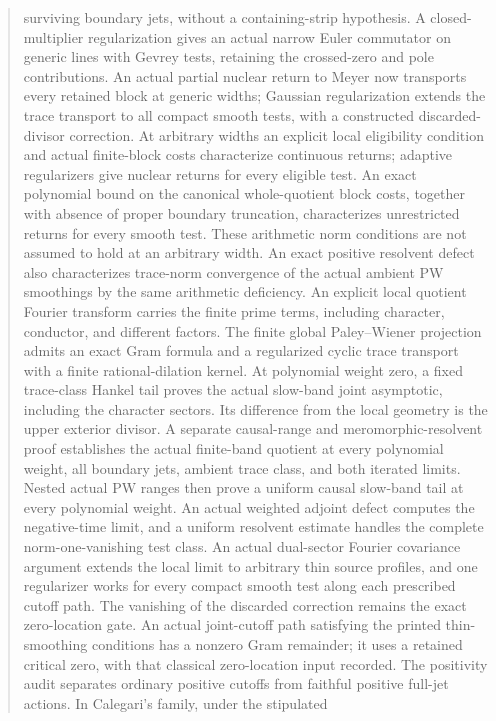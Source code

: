 \documentclass[11pt,a4paper]{article}
\begin{document}
\begin{abstract}
surviving boundary jets, without a containing-strip hypothesis.
A closed-multiplier regularization gives an actual narrow
Euler commutator on generic lines with Gevrey tests, retaining
the crossed-zero and pole contributions. An actual partial nuclear
return to Meyer now transports every retained block at generic
widths; Gaussian regularization extends the trace transport to
all compact smooth tests, with a constructed discarded-divisor
correction. At arbitrary widths an explicit local eligibility condition
and actual finite-block costs characterize continuous returns; adaptive
regularizers give nuclear returns for every eligible test. An exact
polynomial bound on the canonical whole-quotient block costs,
together with absence of proper boundary truncation, characterizes
unrestricted returns for every smooth test. These arithmetic norm
conditions are not assumed to hold at an arbitrary width. An exact
positive resolvent defect also characterizes trace-norm convergence
of the actual ambient PW smoothings by the same arithmetic deficiency. An explicit local quotient Fourier transform carries
the finite prime terms, including character, conductor, and
different factors. The finite global Paley--Wiener projection
admits an exact Gram formula and a regularized cyclic trace
transport with a finite rational-dilation kernel. At polynomial
weight zero, a fixed trace-class Hankel tail proves the actual
slow-band joint asymptotic, including the character sectors. Its
difference from the local geometry is the upper exterior divisor.
A separate causal-range and meromorphic-resolvent proof establishes
the actual finite-band quotient at every polynomial weight, all
boundary jets, ambient trace class, and both iterated limits.
Nested actual PW ranges then prove a uniform causal slow-band
tail at every polynomial weight. An actual weighted adjoint defect
computes the negative-time limit, and a uniform resolvent estimate
handles the complete norm-one-vanishing test class. An actual dual-sector Fourier covariance argument extends the local
limit to arbitrary thin source profiles, and one regularizer works
for every compact smooth test along each prescribed cutoff path.
The vanishing of the discarded correction remains the exact zero-location gate. An actual joint-cutoff path
satisfying the printed thin-smoothing conditions has a nonzero
Gram remainder; it uses a retained critical zero, with that
classical zero-location input recorded. The positivity
audit separates ordinary positive cutoffs from faithful positive
full-jet actions. In Calegari's family, under the stipulated

\end{abstract}
\end{document}
